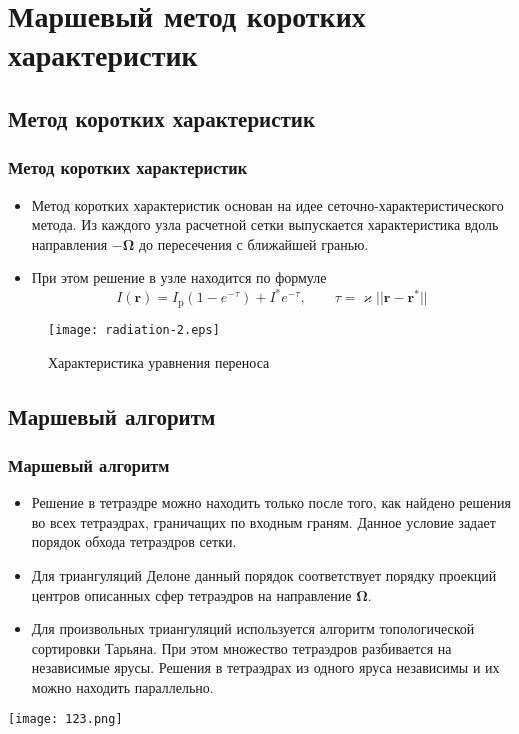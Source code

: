 \documentclass[unicode,aspectratio=43]{beamer}
\newcommand{\I}{\mathrm{\mathit{I}}}
\renewcommand{\vec}[1]{\boldsymbol{\mathbf{#1}}}
\begin{document}

\section{Маршевый метод коротких характеристик}
\subsection{Метод коротких характеристик}
\begin{frame}\frametitle{Метод коротких характеристик}
	\begin{itemize}
	\item Метод коротких характеристик основан на идее сеточно-характеристического метода. Из каждого узла расчетной сетки выпускается характеристика вдоль направления $-\vec \Omega$ до пересечения с ближайшей гранью.
	
	\item При этом решение в узле находится по формуле
	\[
	\I(\vec r) = \I_\text{p} (1 - e^{-\tau}) + \I^* e^{-\tau}, \qquad
	\tau = \varkappa ||\vec r - \vec r^*|| 
	\]
	\end{itemize}
	\begin{figure}
	\centering
	\texttt{[image: radiation-2.eps]}
	\caption{Характеристика уравнения переноса}
	\end{figure}
\end{frame}

\subsection{Маршевый алгоритм}
\begin{frame}\frametitle{Маршевый алгоритм}
	\begin{itemize}
	\item Решение в тетраэдре можно находить только после того, как найдено
решения во всех тетраэдрах, граничащих по входным граням. Данное условие задает порядок обхода тетраэдров сетки.
	\item Для триангуляций Делоне данный порядок соответствует порядку проекций
центров описанных сфер тетраэдров на направление $\vec \Omega$.
	\item Для произвольных триангуляций используется алгоритм топологической
сортировки Тарьяна. При этом множество тетраэдров разбивается на независимые
ярусы. Решения в тетраэдрах из одного яруса независимы и их можно находить
параллельно.
	\end{itemize}
	\begin{center}
	\texttt{[image: 123.png]}
	\end{center}
\end{frame}
\end{document}
